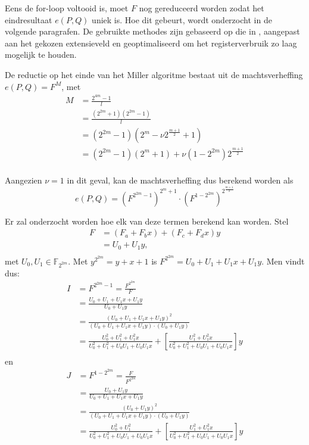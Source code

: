 Eens de for-loop voltooid is, moet $F$ nog gereduceerd worden zodat het eindresultaat $e(P, Q)$ uniek is. Hoe dit gebeurt, wordt onderzocht in de volgende paragrafen. De gebruikte methodes zijn gebaseerd op die in \cite{beuchat}, aangepast aan het gekozen extensieveld en geoptimaliseerd om het registerverbruik zo laag mogelijk te houden.

De reductie op het einde van het Miller algoritme bestaat uit de machtsverheffing $e(P, Q) = F^M$, met
\[\begin{aligned}
M	&= \frac{2^{4m} - 1}{l}\\
	&= \frac{(2^{2m} + 1)(2^{2m} - 1)}{l}\\
	&= (2^{2m} - 1)(2^m - \nu 2^{\frac{m + 1}{2}} + 1)\\
	&= (2^{2m} - 1)(2^m + 1) + \nu(1 - 2^{2m})2^{\frac{m + 1}{2}}\\
\end{aligned}\]

Aangezien $\nu = 1$ in dit geval, kan de machtsverheffing dus berekend worden als
\[e(P, Q) = \left(F^{2^{2m} - 1}\right)^{2^m + 1} \cdot \left(F^{1 - 2^{2m}}\right)^{2^{\frac{m + 1}{2}}}\]

Er zal onderzocht worden hoe elk van deze termen berekend kan worden. Stel
\[\begin{aligned}
F	&= (F_a + F_b x) + (F_c + F_d x)y\\
	&= U_0 + U_1y,\\
\end{aligned}\]
met $U_0, U_1 \in \mathbb{F}_{2^{2m}}$. Met $y^{2^{2m}} = y + x + 1$ is $F^{2^{2m}} = U_0 + U_1 + U_1x + U_1y$. 	Men vindt dus:
\[\begin{aligned}
I  &= F^{2^{2m} - 1} = \frac{F^{2^{2m}}}{F}\\
	&= \frac{U_0 + U_1 + U_1x + U_1y}{U_0 + U_1y}\\
	&= \frac{(U_0 + U_1 + U_1x + U_1y)^2}{(U_0 + U_1 + U_1x + U_1y) \cdot (U_0 + U_1y)}\\
	&= \frac{U_0^2 + U_1^2 + U_1^2x}{U_0^2 + U_1^2 + U_0 U_1 + U_0 U_1 x} + \left[\frac{U_1^2 + U_1^2x}{U_0^2 + U_1^2 + U_0 U_1 + U_0 U_1 x}\right]y\\
\end{aligned}\]
en
\[\begin{aligned}
J  &= F^{1 - 2^{2m}} = \frac{F}{F^{2^{2m}}}\\
	&= \frac{U_0 + U_1y}{U_0 + U_1 + U_1x + U_1y}\\
	&= \frac{(U_0 + U_1y)^2}{(U_0 + U_1 + U_1x + U_1y) \cdot (U_0 + U_1y)}\\
	&= \frac{U_0^2 + U_1^2}{U_0^2 + U_1^2 + U_0 U_1 + U_0 U_1 x} + \left[\frac{U_1^2 + U_1^2x}{U_0^2 + U_1^2 + U_0 U_1 + U_0 U_1 x}\right]y\\
\end{aligned}\]

